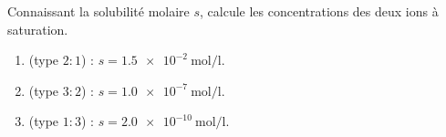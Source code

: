 \documentclass[11pt,a4paper]{article}
\begin{document}
\begin{exo}
Connaissant la solubilité molaire $s$, calcule les concentrations des deux ions à saturation.
\begin{enumerate}[label=\alph*)]
  \item {} (type $2{:}1$) : $s=\qty{1.5e-2}{\mole\per\litre}$.
  \item {} (type $3{:}2$) : $s=\qty{1.0e-7}{\mole\per\litre}$.
  \item {} (type $1{:}3$) : $s=\qty{2.0e-10}{\mole\per\litre}$.
\end{enumerate}
\end{exo}
\end{document}
